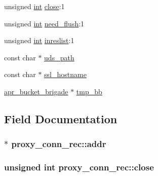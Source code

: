 \begin{DoxyCompactItemize}
\item 
unsigned \hyperlink{pcre_8txt_a42dfa4ff673c82d8efe7144098fbc198}{int} \hyperlink{structproxy__conn__rec_acb5fb6e7736c1833e3da6bfdb2bbe55f}{close}\+:1
\item 
unsigned \hyperlink{pcre_8txt_a42dfa4ff673c82d8efe7144098fbc198}{int} \hyperlink{structproxy__conn__rec_a94e0bb31128a772f7c6557f5427aace5}{need\+\_\+flush}\+:1
\item 
unsigned \hyperlink{pcre_8txt_a42dfa4ff673c82d8efe7144098fbc198}{int} \hyperlink{structproxy__conn__rec_a2b61528adb5642c09a4612bb3b3ceb5a}{inreslist}\+:1
\item 
const char $\ast$ \hyperlink{structproxy__conn__rec_a05cf8ee2b1f688ca7bc107d64d9b1e5c}{uds\+\_\+path}
\item 
const char $\ast$ \hyperlink{structproxy__conn__rec_ab6205c31f7ed891e0a9b133bb4195f51}{ssl\+\_\+hostname}
\item 
\hyperlink{structapr__bucket__brigade}{apr\+\_\+bucket\+\_\+brigade} $\ast$ \hyperlink{structproxy__conn__rec_a39b6234f6ddd489e3b0c539557f242f2}{tmp\+\_\+bb}
\end{DoxyCompactItemize}


\subsection{Field Documentation}
\subsubsection[{\texorpdfstring{addr}{addr}}]{$\ast$ proxy\+\_\+conn\+\_\+rec\+::addr}\hypertarget{structproxy__conn__rec_a743a0aac62712d38e0a7f55675dfaa98}{}\label{structproxy__conn__rec_a743a0aac62712d38e0a7f55675dfaa98}
\subsubsection[{\texorpdfstring{close}{close}}]{\setlength{\rightskip}{0pt plus 5cm}unsigned {\bf int} proxy\+\_\+conn\+\_\+rec\+::close}\hypertarget{structproxy__conn__rec_acb5fb6e7736c1833e3da6bfdb2bbe55f}{}\label{structproxy__conn__rec_acb5fb6e7736c1833e3da6bfdb2bbe55f}
